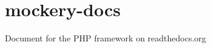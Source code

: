 \chapter{mockery-\/docs}
\hypertarget{md_vendor_2mockery_2mockery_2docs_2_r_e_a_d_m_e}{}\label{md_vendor_2mockery_2mockery_2docs_2_r_e_a_d_m_e}
Document for the PHP  framework on readthedocs.\+org 